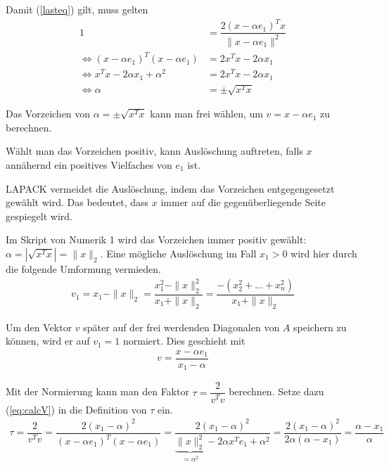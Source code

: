 Damit (\ref{lasteq}) gilt, muss gelten
\begin{align*}
	1 &= \dfrac{2(x - \alpha e_1)^Tx}{\|x - \alpha e_1\|^2}\\
	\Leftrightarrow (x - \alpha e_1)^T(x - \alpha e_1) &= 2 x^T x - 2\alpha x_1 \\
	\Leftrightarrow x^Tx -2\alpha x_1 + \alpha^2 &= 2 x^T x - 2\alpha x_1\\
	\Leftrightarrow \alpha &= \pm \sqrt{x^Tx}
\end{align*}

Das Vorzeichen von  $\alpha = \pm \sqrt{x^Tx}$ kann man frei wählen, um $ v = x - \alpha e_1$ zu berechnen.

Wählt man das Vorzeichen positiv, kann Auslöschung auftreten, falls $x$ annähernd ein positives Vielfaches von $e_1$ ist.

LAPACK \cite{DGEQR2} vermeidet die Auslöschung, indem das Vorzeichen entgegengesetzt gewählt wird. Das bedeutet, dass $x$ immer auf die gegenüberliegende Seite gespiegelt wird.

Im Skript von Numerik 1 \cite{num1} wird das Vorzeichen immer positiv gewählt:\\ $\alpha = |\sqrt{x^Tx}| = \|x\|_2$. Eine mögliche Auslöschung im Fall $ x_1 > 0$ wird hier durch die folgende Umformung vermieden.
\begin{align*}
	v_1 = x_1 - \|x\|_2 = \dfrac{x_1^2 - \|x\|_2^2}{x_1 + \|x\|_2}
	=\dfrac{-(x_2^2+...+x_n^2)}{x_1 + \|x\|_2}
\end{align*}


Um den Vektor $v$ später auf der frei werdenden Diagonalen von $A$ speichern zu können, wird er auf $v_1 = 1$ normiert. Dies geschieht mit 
\begin{align}
v = \dfrac{x - \alpha e_1}{x_1 - \alpha}
\label{eq:calcV}
\end{align}

Mit der Normierung kann man den Faktor $\tau = \dfrac{2}{v^Tv}$ berechnen. Setze dazu (\ref{eq:calcV}) in die Definition von $\tau$ ein.
\begin{align*}
\tau = \dfrac{2}{v^Tv} = \dfrac{2 (x_1 - \alpha)^2}{(x - \alpha e_1)^T (x - \alpha e_1)} = \dfrac{2 (x_1 - \alpha)^2}{\underbrace{\|x\|^2_2}_{ = \alpha^2} - 2\alpha x^Te_1 + \alpha^2} =  \dfrac{2 (x_1 - \alpha)^2}{ 2\alpha (\alpha - x_1)} = \dfrac{\alpha - x_1}{\alpha}
\end{align*}

